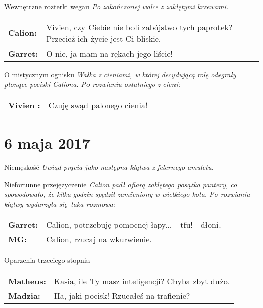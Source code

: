 \documentclass[10pt,twoside,twocolumn]{book}
\begin{document}
\begin{rpg-quotebox}{Wewnętrzne rozterki wegan}
   \textit{Po zakończonej walce z zaklętymi krzewami.}\\
   
   \begin{tabularx}{\columnwidth}{lX}
      \textbf{Calion:} & Vivien, czy Ciebie nie boli zabójstwo tych paprotek? Przecież ich życie jest Ci bliskie.\\
      \textbf{Garret:} & O nie, ja mam na rękach jego liście!
   \end{tabularx}
\end{rpg-quotebox}


\begin{rpg-quotebox}{O mistycznym ognisku}
   \textit{Walka z cieniami, w której decydującą rolę odegrały płonące pociski Caliona. Po rozwianiu ostatniego z cieni:}\\
   
   \begin{tabularx}{\columnwidth}{lX}
      \textbf{Vivien :} & Czuję swąd palonego cienia!\\
   \end{tabularx}
\end{rpg-quotebox}


\section*{6 maja 2017}


\begin{rpg-quotebox}{Niemęskość}
   \textit{Uwiąd prącia jako następna klątwa z felernego amuletu.}
\end{rpg-quotebox}


\begin{rpg-quotebox}{Niefortunne przejęzyczenie}
   \textit{Calion padł ofiarą zaklętego posążka pantery, co spowodowało, że kilka godzin spędził zamieniony w wielkiego kota. Po rozwianiu klątwy wydarzyła się taka rozmowa:}\\
   
   \begin{tabularx}{\columnwidth}{lX}
      \textbf{Garret:} & Calion, potrzebuję pomocnej łapy... - tfu! - dłoni. \\
      \textbf{MG:} & Calion, rzucaj na wkurwienie. \\
   \end{tabularx}
\end{rpg-quotebox}


\begin{rpg-quotebox}{Oparzenia trzeciego stopnia}
   \begin{tabularx}{\columnwidth}{lX}
      \textbf{Matheus:} & Kasia, ile Ty masz inteligencji? Chyba zbyt dużo.\\
      \textbf{Madzia:} & Ha, jaki pocisk! Rzucałeś na trafienie?\\
   \end{tabularx}
\end{rpg-quotebox}
\end{document}
